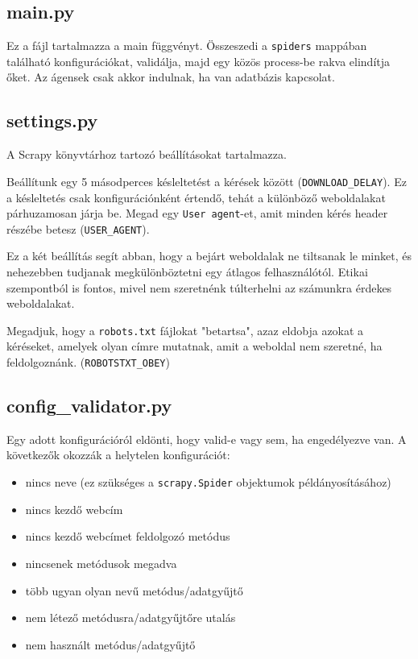 \documentclass[10pt]{article}
\begin{document}
\subsection{main.py}
Ez a fájl tartalmazza a main függvényt. Összeszedi a \lstinline{spiders} mappában található konfigurációkat, validálja, majd egy közös process-be rakva elindítja őket. Az ágensek csak akkor indulnak, ha van adatbázis kapcsolat.

\subsection{settings.py}
A Scrapy könyvtárhoz tartozó beállításokat tartalmazza. \cite{scrapy_settings}

Beállítunk egy 5 másodperces késleltetést a kérések között (\lstinline{DOWNLOAD_DELAY}). Ez a késleltetés csak konfigurációnként értendő, tehát a különböző weboldalakat párhuzamosan járja be. Megad egy \lstinline{User agent}-et, amit minden kérés header részébe betesz (\lstinline{USER_AGENT}).

Ez a két beállítás segít abban, hogy a bejárt weboldalak ne tiltsanak le minket, és nehezebben tudjanak megkülönböztetni egy átlagos felhasználótól. Etikai szempontból is fontos, mivel nem szeretnénk túlterhelni az számunkra érdekes weboldalakat.

Megadjuk, hogy a \lstinline{robots.txt} \cite{wikipedia_robotstxt} fájlokat "betartsa", azaz eldobja azokat a kéréseket, amelyek olyan címre mutatnak, amit a weboldal nem szeretné, ha feldolgoznánk. (\lstinline{ROBOTSTXT_OBEY})

\subsection{config\_validator.py}
Egy adott konfigurációról eldönti, hogy valid-e vagy sem, ha engedélyezve van. A következők okozzák a helytelen konfigurációt:
\begin{itemize}
    \item nincs neve (ez szükséges a \lstinline{scrapy.Spider} objektumok példányosításához)
    \item nincs kezdő webcím
    \item nincs kezdő webcímet feldolgozó metódus
    \item nincsenek metódusok megadva
    \item több ugyan olyan nevű metódus/adatgyűjtő
    \item nem létező metódusra/adatgyűjtőre utalás
    \item nem használt metódus/adatgyűjtő
\end{itemize}
\end{document}
